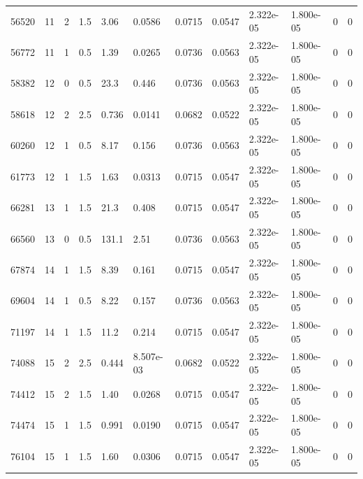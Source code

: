 \documentclass[preview]{standalone}
\begin{document}
{{\begin{tabular}{L{1.2cm}C{1.2cm} C{0.3cm}C{0.5cm} C{1.4cm}C{1.4cm} C{1.4cm}C{1.4cm} C{1.6cm}C{1.6cm} C{1.6cm}C{1.6cm}}
  56520  &    11  & 2     & 1.5 &  3.06  & 0.0586  &  0.0715&   0.0547& 2.322e-05 & 1.800e-05   &  0 & 0  \\ 
  56772  &    11  & 1     & 0.5 &  1.39  & 0.0265  &  0.0736&   0.0563& 2.322e-05 & 1.800e-05   &  0 & 0  \\ 
  58382  &    12  & 0     & 0.5 &  23.3  & 0.446  &  0.0736&   0.0563& 2.322e-05 & 1.800e-05   &  0 & 0  \\ 
  58618  &    12  & 2     & 2.5 &  0.736  & 0.0141  &  0.0682&   0.0522& 2.322e-05 & 1.800e-05   &  0 & 0  \\ 
  60260  &    12  & 1     & 0.5 &  8.17  & 0.156  &  0.0736&   0.0563& 2.322e-05 & 1.800e-05   &  0 & 0  \\ 
  61773  &    12  & 1     & 1.5 &  1.63  & 0.0313  &  0.0715&   0.0547& 2.322e-05 & 1.800e-05   &  0 & 0  \\ 
  66281  &    13  & 1     & 1.5 &  21.3  & 0.408  &  0.0715&   0.0547& 2.322e-05 & 1.800e-05   &  0 & 0  \\ 
  66560  &    13  & 0     & 0.5 &  131.1  & 2.51  &  0.0736&   0.0563& 2.322e-05 & 1.800e-05   &  0 & 0  \\ 
  67874  &    14  & 1     & 1.5 &  8.39  & 0.161  &  0.0715&   0.0547& 2.322e-05 & 1.800e-05   &  0 & 0  \\ 
  69604  &    14  & 1     & 0.5 &  8.22  & 0.157  &  0.0736&   0.0563& 2.322e-05 & 1.800e-05   &  0 & 0  \\ 
  71197  &    14  & 1     & 1.5 &  11.2  & 0.214  &  0.0715&   0.0547& 2.322e-05 & 1.800e-05   &  0 & 0  \\ 
  74088  &    15  & 2     & 2.5 &  0.444  & 8.507e-03  &  0.0682&   0.0522& 2.322e-05 & 1.800e-05   &  0 & 0  \\ 
  74412  &    15  & 2     & 1.5 &  1.40  & 0.0268  &  0.0715&   0.0547& 2.322e-05 & 1.800e-05   &  0 & 0  \\ 
  74474  &    15  & 1     & 1.5 &  0.991  & 0.0190  &  0.0715&   0.0547& 2.322e-05 & 1.800e-05   &  0 & 0  \\ 
  76104  &    15  & 1     & 1.5 &  1.60  & 0.0306  &  0.0715&   0.0547& 2.322e-05 & 1.800e-05   &  0 & 0  \\ 
\hline 
\end{tabular} 

}}
\end{document}
